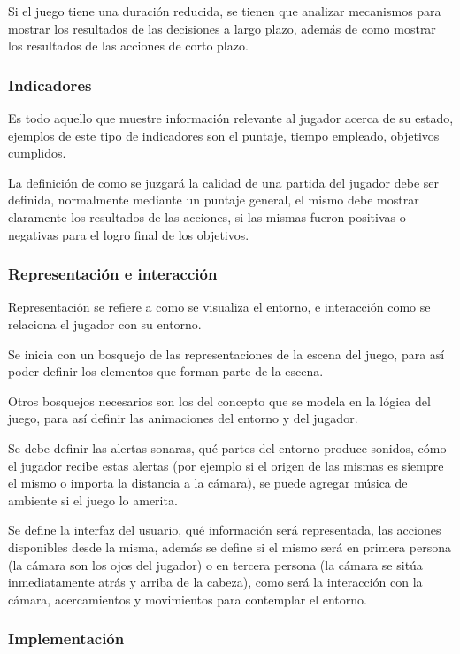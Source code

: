 Si el juego tiene una duración reducida, se tienen que analizar mecanismos para
mostrar los resultados de las decisiones a largo plazo, además de como mostrar
los resultados de las acciones de corto plazo.

\subsubsection{Indicadores}

Es todo aquello que muestre información relevante al jugador acerca de su
estado, ejemplos de este tipo de indicadores son el puntaje, tiempo empleado,
objetivos cumplidos. 

La definición de como se juzgará la calidad de una partida del jugador debe ser
definida, normalmente mediante un puntaje general, el mismo debe mostrar
claramente los resultados de las acciones, si las mismas fueron positivas o
negativas para el logro final de los objetivos.

\subsubsection{Representación e interacción}

Representación se refiere a como se visualiza el entorno, e interacción como se
relaciona el jugador con su entorno.

Se inicia con un bosquejo de las representaciones de la escena del juego, para
así poder definir los elementos que forman parte de la escena.

Otros bosquejos necesarios son los del concepto que se modela en la lógica del
juego, para así definir las animaciones del entorno y del jugador.

Se debe definir las alertas sonaras, qué partes del entorno produce sonidos,
cómo el jugador recibe estas alertas (por ejemplo si el origen de las mismas es
siempre el mismo o importa la distancia a la cámara), se puede agregar música de
ambiente si el juego lo amerita.

Se define la interfaz del usuario, qué información será representada, las
acciones disponibles desde la misma, además se define si el mismo será en
primera persona (la cámara son los ojos del jugador) o en tercera persona (la
cámara se sitúa inmediatamente atrás y arriba de la cabeza), como será la
interacción con la cámara, acercamientos y movimientos para contemplar el
entorno.

\subsubsection{Implementación} 

